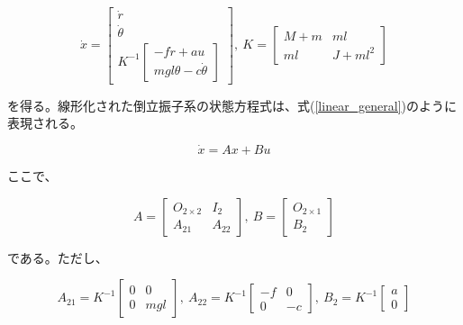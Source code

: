 \documentclass[a4j,11pt,twoside]{jbook}
\begin{document}
\begin{equation}
    \dot x = 
    \left[
        \begin{array}{c}
            \dot{r} \\
            \dot{\theta} \\
            K^{-1}
            \left[
                \begin{array}{c}
                    -f \dot{r} + au \\
                    mgl \theta - c \dot{\theta}
                \end{array}
            \right]
        \end{array}    
    \right],\
    K = 
    \left[
        \begin{array}{cc}
            M + m  &  ml \\
            ml     &  J + ml^2
        \end{array}
    \right]
\end{equation}

を得る。線形化された倒立振子系の状態方程式は、式(\ref{linear_general})のように表現される。

\begin{equation}
    \dot x = Ax + Bu
    \label{linear_general}
\end{equation}

ここで、

$$
    A = 
    \left[
        \begin{array}{cc}
            O_{2 \times 2}  &  I_{2} \\
            A_{21}          &  A_{22}
        \end{array}
    \right],\
    B = 
     \left[
        \begin{array}{c}
            O_{2 \times 1} \\
            B_{2}
        \end{array}
    \right]
$$

である。ただし、

$$
    A_{21} = K^{-1}
    \left[
        \begin{array}{cc}
            0  &  0 \\
            0  &  mgl
        \end{array}    
    \right],\
    A_{22} = K^{-1}
    \left[
        \begin{array}{cc}
            -f  &  0 \\
            0   &  -c
        \end{array}    
    \right],\
    B_{2} = K^{-1}
    \left[
        \begin{array}{c}
            a \\
            0
        \end{array}    
    \right]
$$
\end{document}
